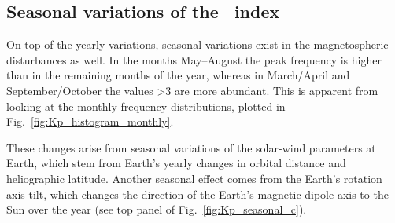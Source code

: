 \subsection{Seasonal variations of the \Kp{}~index}
On top of the yearly variations, seasonal variations exist in the magnetospheric disturbances as well. In the months May--August the \Kp{} peak frequency is higher than in the remaining months of the year, whereas in March/April and September/October the \Kp{} values \num{>3} are more abundant. This is apparent from looking at the monthly \Kp{} frequency distributions, plotted in Fig.~\ref{fig:Kp_histogram_monthly}.
\begin{figure}
\end{figure}
These \Kp{} changes arise from seasonal variations of the solar-wind parameters at Earth, which stem from Earth's yearly changes in orbital distance and heliographic latitude. Another seasonal effect comes from the Earth's rotation axis tilt, which changes the direction of the Earth's magnetic dipole axis to the Sun over the year (see top panel of Fig.~\ref{fig:Kp_seasonal_c}).
\begin{figure}
\end{figure}

